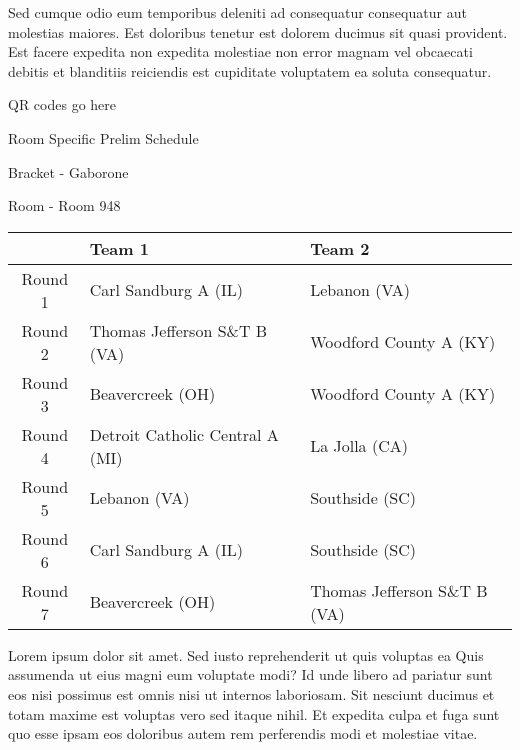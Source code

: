 \documentclass{article}%
\begin{document}
\newline%
Sed cumque odio eum temporibus deleniti ad consequatur consequatur aut molestias maiores. Est doloribus tenetur est dolorem ducimus sit quasi provident. Est facere expedita non expedita molestiae non error magnam vel obcaecati debitis et blanditiis reiciendis est cupiditate voluptatem ea soluta consequatur.%
\vspace*{140pt}%
\begin{center}%
\begin{Huge}%
QR codes go here%
\end{Huge}%
\end{center}%
\newpage%
\begin{center}%
\begin{Huge}%
Room Specific Prelim Schedule%
\end{Huge}%
\vspace*{8pt}%
\linebreak%
\begin{Large}%
Bracket {-} Gaborone%
\end{Large}%
\vspace*{8pt}%
\linebreak%
\vspace*{8pt}%
\begin{Large}%
Room {-} Room 948%
\end{Large}%
\end{center}%
%
\begin{tabularx}{\textwidth}{|c|Y|Y|}%
\hline%
&Team 1&Team 2\\%
\hline%
Round 1&Carl Sandburg A (IL)&Lebanon (VA)\\%
Round 2&Thomas Jefferson S\&T B (VA)&Woodford County A (KY)\\%
Round 3&Beavercreek (OH)&Woodford County A (KY)\\%
Round 4&Detroit Catholic Central A (MI)&La Jolla (CA)\\%
Round 5&Lebanon (VA)&Southside (SC)\\%
Round 6&Carl Sandburg A (IL)&Southside (SC)\\%
Round 7&Beavercreek (OH)&Thomas Jefferson S\&T B (VA)\\%
\hline%
\end{tabularx}%
\vspace*{8pt}%
\newline%
Lorem ipsum dolor sit amet. Sed iusto reprehenderit ut quis voluptas ea Quis assumenda ut eius magni eum voluptate modi? Id unde libero ad pariatur sunt eos nisi possimus est omnis nisi ut internos laboriosam. Sit nesciunt ducimus et totam maxime est voluptas vero sed itaque nihil. Et expedita culpa et fuga sunt quo esse ipsam eos doloribus autem rem perferendis modi et molestiae vitae.\newline%
\end{document}
